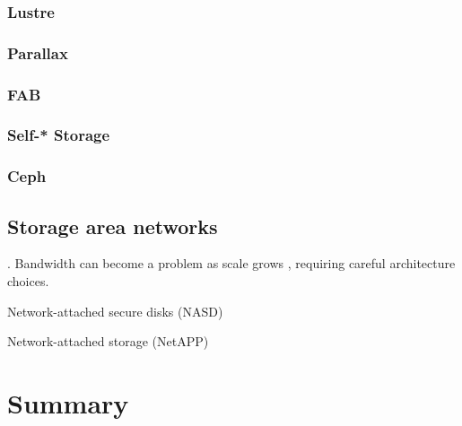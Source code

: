 \subsubsection{Lustre}
\cite{lustre}
\subsubsection{Parallax}
\cite{warfield}
\subsubsection{FAB}
\cite{frolund,saito04,ji}
\subsubsection{Self-* Storage}
\cite{ganger}
\subsubsection{Ceph}
\cite{weil}

\subsection{Storage area networks}
\cite{burns}. Bandwidth can become a problem as scale grows \cite{hospodor}, requiring careful architecture choices.

Network-attached secure disks (NASD) \cite{gibson97,gibson98a}

Network-attached storage (NetAPP) \cite{hitz}

\section{Summary}
